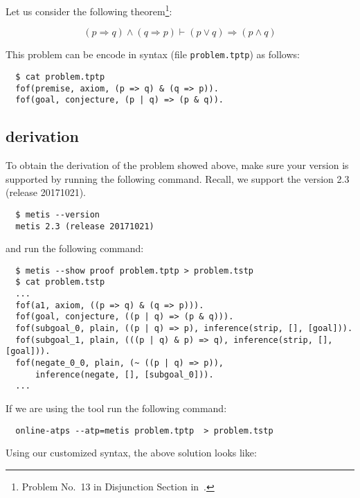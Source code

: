 \documentclass[../main.tex]{subfiles}
\begin{document}
\begin{subappendices}
Let us consider the following
theorem\footnote{Problem No.~13 in Disjunction Section in~\cite{Prieto-Cubides2017}.}:

\begin{equation}
\label{eq:complete-example-problem}
(p \Rightarrow q) \wedge (q \Rightarrow p) ⊢ (p \vee q) \Rightarrow (p \wedge q)
\end{equation}

This problem can be encode in \TPTP syntax (file \verb!problem.tptp!) as follows:

\begin{verbatim}
  $ cat problem.tptp
  fof(premise, axiom, (p => q) & (q => p)).
  fof(goal, conjecture, (p | q) => (p & q)).
\end{verbatim}

\subsection{\Metis derivation}

To obtain the \Metis derivation of the \TPTP problem showed above,
make sure your \Metis version is supported by running the following command.
Recall, we support the version 2.3 (release 20171021).

\begin{verbatim}
  $ metis --version
  metis 2.3 (release 20171021)
\end{verbatim}

and run the following command:

\begin{verbatim}
  $ metis --show proof problem.tptp > problem.tstp
  $ cat problem.tstp
  ...
  fof(a1, axiom, ((p => q) & (q => p))).
  fof(goal, conjecture, ((p | q) => (p & q))).
  fof(subgoal_0, plain, ((p | q) => p), inference(strip, [], [goal])).
  fof(subgoal_1, plain, (((p | q) & p) => q), inference(strip, [], [goal])).
  fof(negate_0_0, plain, (~ ((p | q) => p)),
      inference(negate, [], [subgoal_0])).
  ...
\end{verbatim}

If we are using the  tool run the following command:

\begin{verbatim}
  online-atps --atp=metis problem.tptp  > problem.tstp
\end{verbatim}

Using our customized \TSTP syntax, the above \Metis solution looks like:


\end{subappendices}
\end{document}
